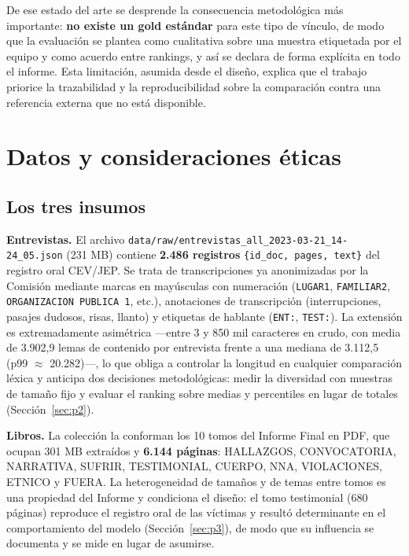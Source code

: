 \documentclass[11pt]{tg_usta}
\begin{document}
De ese estado del arte se desprende la consecuencia metodológica más importante: \textbf{no existe un gold estándar} para este tipo de vínculo, de modo que la evaluación se plantea como cualitativa sobre una muestra etiquetada por el equipo y como acuerdo entre rankings, y así se declara de forma explícita en todo el informe. Esta limitación, asumida desde el diseño, explica que el trabajo priorice la trazabilidad y la reproducibilidad sobre la comparación contra una referencia externa que no está disponible.


\section{Datos y consideraciones éticas}\label{sec:datos}

\subsection{Los tres insumos}

\textbf{Entrevistas.} El archivo \texttt{data/raw/entrevistas\_all\_2023-03-21\_14-24\_05.json} (231 MB) contiene \textbf{2.486 registros} \texttt{\{id\_doc, pages, text\}} del registro oral CEV/JEP. Se trata de transcripciones ya anonimizadas por la Comisión mediante marcas en mayúsculas con numeración (\texttt{LUGAR1}, \texttt{FAMILIAR2}, \texttt{ORGANIZACION PUBLICA 1}, etc.), anotaciones de transcripción (interrupciones, pasajes dudosos, risas, llanto) y etiquetas de hablante (\texttt{ENT:}, \texttt{TEST:}). La extensión es extremadamente asimétrica ---entre 3 y 850 mil caracteres en crudo, con media de 3.902,9 lemas de contenido por entrevista frente a una mediana de 3.112,5 (p99 $\approx$ 20.282)---, lo que obliga a controlar la longitud en cualquier comparación léxica y anticipa dos decisiones metodológicas: medir la diversidad con muestras de tamaño fijo y evaluar el ranking sobre medias y percentiles en lugar de totales (Sección~\ref{sec:p2}).

\textbf{Libros.} La colección la conforman los 10 tomos del Informe Final en PDF, que ocupan 301 MB extraídos y \textbf{6.144 páginas}: HALLAZGOS, CONVOCATORIA, NARRATIVA, SUFRIR, TESTIMONIAL, CUERPO, NNA, VIOLACIONES, ETNICO y FUERA. La heterogeneidad de tamaños y de temas entre tomos es una propiedad del Informe y condiciona el diseño: el tomo testimonial (680 páginas) reproduce el registro oral de las víctimas y resultó determinante en el comportamiento del modelo (Sección~\ref{sec:p3}), de modo que su influencia se documenta y se mide en lugar de asumirse.
\end{document}
